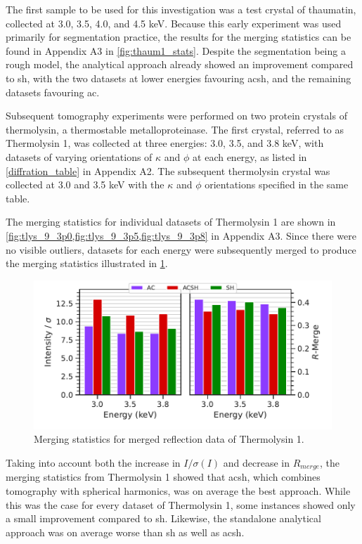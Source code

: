 The first sample to be used for this investigation was a test crystal of thaumatin, collected at 3.0, 3.5, 4.0, and 4.5 \unit{keV}. Because this early experiment was used primarily for segmentation practice, the results for the merging statistics can be found in Appendix A3 in \cref{fig:thaum1_stats}. Despite the segmentation being a rough model, the analytical approach already showed an improvement compared to \ac{sh}, with the two datasets at lower energies favouring \ac{acsh}, and the remaining datasets favouring \ac{ac}.

Subsequent tomography experiments were performed on two protein crystals of thermolysin, a thermostable metalloproteinase. The first crystal, referred to as Thermolysin 1, was collected at three energies: 3.0, 3.5, and 3.8 \unit{keV}, with datasets of varying orientations of $\kappa$ and $\phi$ at each energy, as listed in \cref{diffration_table} in Appendix A2. The subsequent thermolysin crystal was collected at 3.0 and 3.5 \unit{keV} with the $\kappa$ and $\phi$ orientations specified in the same table.

The merging statistics for individual datasets of Thermolysin 1 are shown in \cref{fig:tlys_9_3p0,fig:tlys_9_3p5,fig:tlys_9_3p8} in Appendix A3. Since there were no visible outliers, datasets for each energy were subsequently merged to produce the merging statistics illustrated in \cref{fig:tlys_9_stats}.%

\begin{figure}
    \centering
    \includegraphics{plots/exp1/tlys_9_P6122/merged_stats.pdf}
    \caption{Merging statistics for merged reflection data of Thermolysin 1.}
    \label{fig:tlys_9_stats}
\end{figure}


Taking into account both the increase in $I/\sigma(I)$ and decrease in $R_{merge}$, the merging statistics from Thermolysin 1 showed that \ac{acsh}, which combines tomography with spherical harmonics, was on average the best approach. While this was the case for every dataset of Thermolysin 1, some instances showed only a small improvement compared to \ac{sh}. Likewise, the standalone analytical approach was on average worse than \ac{sh} as well as \ac{acsh}.

